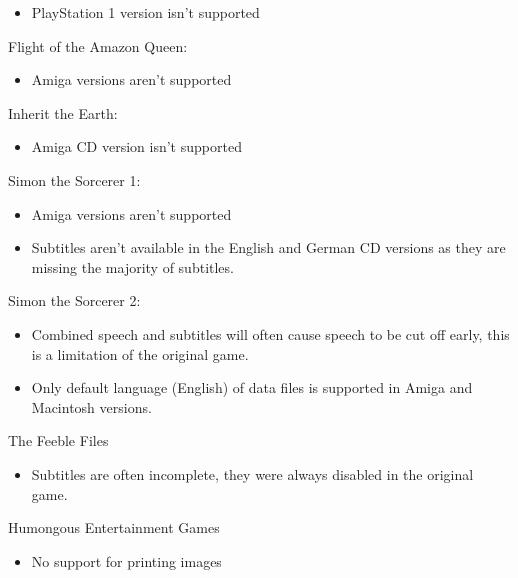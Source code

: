   \begin{itemize}
  \item PlayStation 1 version isn't supported
  \end{itemize}
Flight of the Amazon Queen:
  \begin{itemize}
  \item Amiga versions aren't supported
  \end{itemize}
Inherit the Earth:
  \begin{itemize}
  \item Amiga CD version isn't supported
  \end{itemize}
Simon the Sorcerer 1:
  \begin{itemize}
  \item Amiga versions aren't supported
  \item Subtitles aren't available in the English and German CD versions
            as they are missing the majority of subtitles.
  \end{itemize}
Simon the Sorcerer 2:
  \begin{itemize}
  \item Combined speech and subtitles will often cause speech to be
            cut off early, this is a limitation of the original game.
  \item Only default language (English) of data files is supported
            in Amiga and Macintosh versions.
  \end{itemize}
The Feeble Files
  \begin{itemize}
  \item Subtitles are often incomplete, they were always disabled in the
            original game.
  \end{itemize}
Humongous Entertainment Games
  \begin{itemize}
  \item No support for printing images
  \end{itemize}


